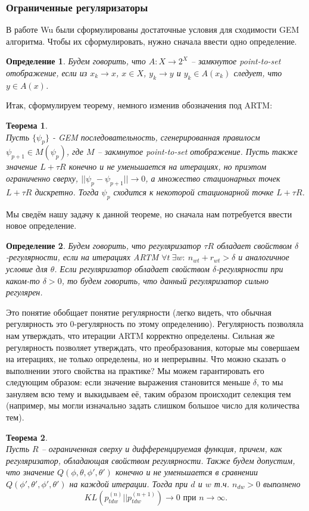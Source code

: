 \documentclass[12pt]{article}
\newtheorem{definition}{Определение}[section]
\newtheorem{theorem}{Теорема}
\begin{document}
	\subsubsection{Ограниченные регуляризаторы}
	 В работе Wu \cite{wuem} были сформулированы достаточные условия для сходимости GEM алгоритма. Чтобы их сформулировать, нужно сначала ввести одно определение.
	\begin{definition}
	Будем говорить, что $A\colon X \to 2^X$ -- замкнутое point-to-set отображение, если из $x_k \to x$, $x \in X$, $y_k \to y$ и $y_k \in A(x_k)$ следует, что $y \in A(x)$.
	\end{definition}
	Итак, сформулируем теорему, немного изменив обозначения под ARTM:
	\begin{theorem} \label{theorem_wu} \ \\
	Пусть $\{\psi_p\}$ - GEM последовательность, сгенерированная правилосм $\psi_{p+1} \in M(\psi_p)$, где $M$ -- закмнутое point-to-set отображение. Пусть также значение $L + \tau R$ конечно и не уменьшается на итерациях, но приэтом ограниченно сверху, $|| \psi_p - \psi_{p+1}|| \to 0$, а множество стационарных точек $L + \tau R$ дискретно. Тогда $\psi_p$ сходится к некоторой стационарной точке $L + \tau R$.
	\end{theorem}
	Мы сведём нашу задачу к данной теореме, но сначала нам потребуется ввести новое определение.
	\begin{definition}
	Будем говорить, что регуляризатор $\tau R$ обладает свойством $\delta$-регулярности, если на итерациях ARTM $\forall t~\exists w \colon~n_{wt} + r_{wt} > \delta$ и аналогичное условие для $\theta$. Если регуляризатор  обладает свойством $\delta$-регулярности при каком-то $\delta > 0$, то будем говорить, что данный регуляризатор сильно регулярен.
	\end{definition}
	Это понятие обобщает понятие регулярности (легко видеть, что обычная регулярность это 0-регулярность по этому определению). Регулярность позволяла нам утверждать, что итерации ARTM корректно определены. Сильная же регулярность позволяет утверждать, что преобразования, которые мы совершаем на итерациях, не только определены, но и непрерывны. Что можно сказать о выполнении этого свойства на практике? Мы можем гарантировать его следующим образом: если значение выражения становится меньше $\delta$, то мы зануляем всю тему и выкидываем её, таким образом происходит селекция тем (например, мы могли изначально задать слишком большое число для количества тем).
	\begin{theorem} \label{theorem_neighbour_zero1} \ \\
	Пусть $R$ -- ограниченная сверху и дифференцируемая функция, причем, как регуляризатор, обладающая свойством регулярности. Также будем допустим,  что значение $Q(\phi, \theta, \phi', \theta')$ конечно и не уменьшается в сравнении $Q(\phi', \theta', \phi', \theta')$ на каждой итерации. Тогда при $d$ и $w$ т.ч. $n_{dw} > 0$ выполнено
\[
KL(p_{tdw}^{(n)}||p_{tdw}^{(n + 1)}) \to 0 \text{ при } n \to \infty.
\]
	\end{theorem}
\end{document}
